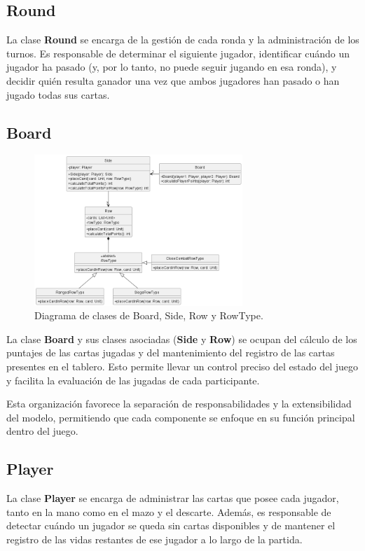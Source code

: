 \documentclass[titlepage,a4paper]{article}
\begin{document}
\subsection*{Round}
La clase \textbf{Round} se encarga de la gestión de cada ronda y la administración de los turnos. Es responsable de determinar el siguiente jugador, identificar cuándo un jugador ha pasado (y, por lo tanto, no puede seguir jugando en esa ronda), y decidir quién resulta ganador una vez que ambos jugadores han pasado o han jugado todas sus cartas.

\subsection*{Board}

\begin{figure}[H]
    \centering
    \includegraphics[width=0.7\textwidth]{../../../diagrams/classes/board.png}
    \caption{Diagrama de clases de Board, Side, Row y RowType.}
\end{figure}

La clase \textbf{Board} y sus clases asociadas (\textbf{Side} y \textbf{Row}) se ocupan del cálculo de los puntajes de las cartas jugadas y del mantenimiento del registro de las cartas presentes en el tablero. Esto permite llevar un control preciso del estado del juego y facilita la evaluación de las jugadas de cada participante.

Esta organización favorece la separación de responsabilidades y la extensibilidad del modelo, permitiendo que cada componente se enfoque en su función principal dentro del juego.

\subsection*{Player}
La clase \textbf{Player} se encarga de administrar las cartas que posee cada jugador, tanto en la mano como en el mazo y el descarte. Además, es responsable de detectar cuándo un jugador se queda sin cartas disponibles y de mantener el registro de las vidas restantes de ese jugador a lo largo de la partida.
\end{document}
